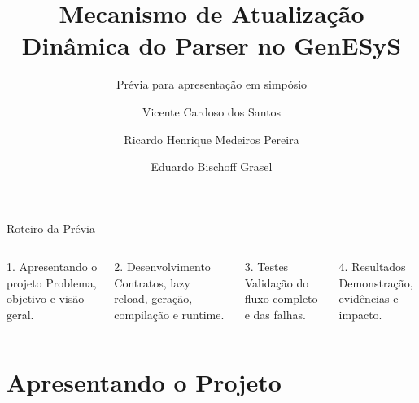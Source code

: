 \documentclass[aspectratio=169,11pt]{beamer}
\title[Parser Din\^amico no GenESyS]{Mecanismo de Atualiza\c{c}\~ao Din\^amica do Parser no GenESyS}
\subtitle{Pr\'evia para apresenta\c{c}\~ao em simp\'osio}
\author[Vicente, Ricardo, Eduardo]{
Vicente Cardoso dos Santos \and
Ricardo Henrique Medeiros Pereira \and
Eduardo Bischoff Grasel
}
\institute[UFSC]{Universidade Federal de Santa Catarina \\ INE5425 -- Modelagem e Simula\c{c}\~ao}
\date{}
\begin{document}
\begin{frame}
    \titlepage
\end{frame}

\begin{frame}{Roteiro da Pr\'evia}
    \begin{columns}[T,onlytextwidth]
        \begin{block}{1. Apresentando o projeto}
            Problema, objetivo e vis\~ao geral.
        \end{block}
        \begin{block}{2. Desenvolvimento}
            Contratos, lazy reload, gera\c{c}\~ao, compila\c{c}\~ao e runtime.
        \end{block}
        \begin{block}{3. Testes}
            Valida\c{c}\~ao do fluxo completo e das falhas.
        \end{block}
        \begin{block}{4. Resultados}
            Demonstra\c{c}\~ao, evid\^encias e impacto.
        \end{block}
    \end{columns}
\end{frame}

\section{Apresentando o Projeto}
\end{document}
